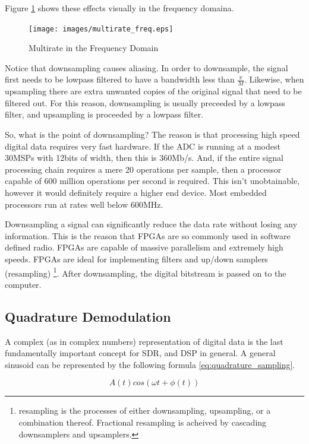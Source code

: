 \documentclass[a4paper, 12pt, notitlepage]{article}
\begin{document}
Figure \ref{fig:multirate_freq} shows these effects visually in the frequency domaina.

\begin{figure}[h]
\caption{Multirate in the Frequency Domain}
\label{fig:multirate_freq}
\centering
\texttt{[image: images/multirate\_freq.eps]}
\end{figure}

Notice that downsampling causes aliasing.  In order to downsample, the signal first needs to be lowpass filtered to have a bandwidth less than $\frac{\pi}{M}$.  Likewise, when upsampling there are extra unwanted copies of the original signal that need to be filtered out.  For this reason, downsampling is usually preceeded by a lowpass filter, and upsampling is proceeded by a lowpass filter.

So, what is the point of downsampling?  The reason is that processing high speed digital data requires very fast hardware.  If the ADC is running at a modest 30MSPs with 12bits of width, then this is 360Mb/s.  And, if the entire signal processing chain requires a mere 20 operations per sample, then a processor capable of 600 million operations per second is required.  This isn't unobtainable, however it would definitely require a higher end device.  Most embedded processors run at rates well below 600MHz.  

Downsampling a signal can significantly reduce the data rate without losing any information.  This is the reason that FPGAs are so commonly used in software defined radio.  FPGAs are capable of massive parallelism and extremely high speeds.  FPGAs are ideal for implementing filters and up/down samplers (resampling) \footnote{resampling is the processes of either downsampling, upsampling, or a combination thereof.  Fractional resampling is acheived by cascading downsamplers and upsamplers.}.  After downsampling, the digital bitstream is passed on to the computer.

\subsection{Quadrature Demodulation}
\label{sec:quadrature_sampling}
A complex (as in complex numbers) representation of digital data is the last fundamentally important concept for SDR, and DSP in general.  A general sinusoid can be represented by the following formula \ref{eq:quadrature_sampling}.

\begin{equation}
\label{eq:quadrature_sampling}
A(t)cos(\omega t + \phi (t))
\end{equation}
\end{document}
